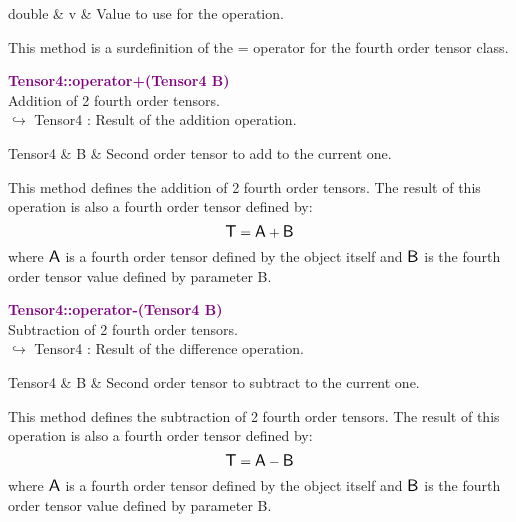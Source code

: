 \begin{tcolorbox}[width=\textwidth,myArgs,tabularx={ll|R}]
double & v & Value to use for the operation.
\end{tcolorbox}

This method is a surdefinition of the = operator for the fourth order tensor class.

\textcolor{purple}{\textbf{Tensor4::operator+(Tensor4 B)}}\label{Tensor4::operator+(Tensor4 B)}\\
Addition of 2 fourth order tensors.\\ \hspace*{10mm}$\hookrightarrow$ Tensor4 : Result of the addition operation.

\begin{tcolorbox}[width=\textwidth,myArgs,tabularx={ll|R}]
Tensor4 & B & Second order tensor to add to the current one.
\end{tcolorbox}

This method defines the addition of 2 fourth order tensors.
The result of this operation is also a fourth order tensor defined by:
\begin{equation*}
\mbox{\large\ensuremath{\mathsf{T}}} = \mbox{\large\ensuremath{\mathsf{A}}} + \mbox{\large\ensuremath{\mathsf{B}}}
\end{equation*}
where $\mbox{\large\ensuremath{\mathsf{A}}}$ is a fourth order tensor defined by the object itself and $\mbox{\large\ensuremath{\mathsf{B}}}$ is the fourth order tensor value defined by parameter B.

\textcolor{purple}{\textbf{Tensor4::operator-(Tensor4 B)}}\label{Tensor4::operator-(Tensor4 B)}\\
Subtraction of 2 fourth order tensors.\\ \hspace*{10mm}$\hookrightarrow$ Tensor4 : Result of the difference operation.

\begin{tcolorbox}[width=\textwidth,myArgs,tabularx={ll|R}]
Tensor4 & B & Second order tensor to subtract to the current one.
\end{tcolorbox}

This method defines the subtraction of 2 fourth order tensors.
The result of this operation is also a fourth order tensor defined by:
\begin{equation*}
\mbox{\large\ensuremath{\mathsf{T}}} = \mbox{\large\ensuremath{\mathsf{A}}} - \mbox{\large\ensuremath{\mathsf{B}}}
\end{equation*}
where $\mbox{\large\ensuremath{\mathsf{A}}}$ is a fourth order tensor defined by the object itself and $\mbox{\large\ensuremath{\mathsf{B}}}$ is the fourth order tensor value defined by parameter B.

